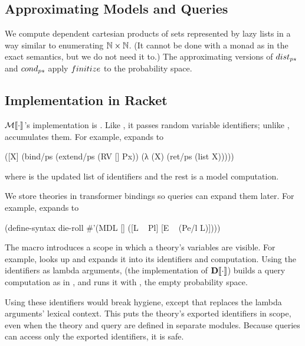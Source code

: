 \subsection{Approximating Models and Queries}

We compute dependent cartesian products of sets represented by lazy lists in a way similar to enumerating $\mathbb{N} \times \mathbb{N}$. (It cannot be done with a monad as in the exact semantics, but we do not need it to.) The approximating versions of $dist_{ps}$ and $cond_{ps}$ apply $finitize$ to the probability space.

\subsection{Implementation in Racket}

$\mathcal{M}\!\left\llbracket{\cdot}\right\rrbracket$'s implementation is . Like , it passes random variable identifiers; unlike ,  accumulates them. For example,  expands to
\begin{center}
\begin{schemedisplay}
([X] (bind/ps (extend/ps (RV [] Px)) (λ (X) (ret/ps (list X)))))
\end{schemedisplay}
\end{center}
where \scheme{[X]} is the updated list of identifiers and the rest is a model computation.

We store theories in transformer bindings so queries can expand them later. For example,  expands to
\begin{center}
\begin{schemedisplay}
(define-syntax die-roll #'(MDL [] ([L ~ Pl] [E ~ (Pe/l L)])))
\end{schemedisplay}
\end{center}
The macro  introduces a scope in which a theory's variables are visible. For example,   looks up  and expands it into its identifiers and computation. Using the identifiers as lambda arguments,  (the implementation of $\mathbf{D}\!\left\llbracket{\cdot}\right\rrbracket$) builds a query computation as in , and runs it with , the empty probability space.

Using these identifiers would break hygiene, except that  replaces the lambda arguments' lexical context. This puts the theory's exported identifiers in scope, even when the theory and query are defined in separate modules. Because queries can access only the exported identifiers, it is safe.

